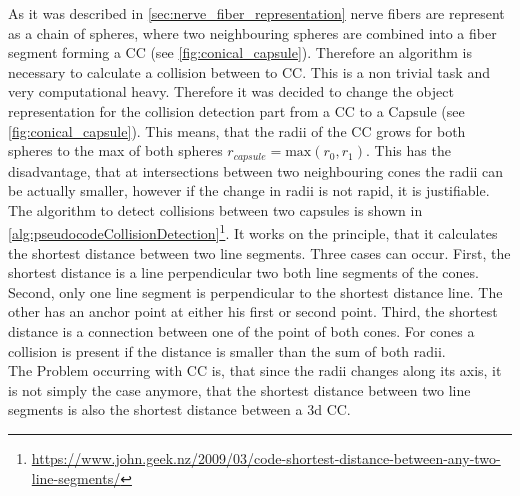 % 
As it was described in \cref{sec:nerve_fiber_representation} nerve fibers are represent as a chain of spheres, where two neighbouring spheres are combined into a fiber segment forming a \ac{CC} (see \cref{fig:conical_capsule}).
% 
Therefore an algorithm is necessary to calculate a collision between to \ac{CC}.
This is a non trivial task and very computational heavy.
Therefore it was decided to change the object representation for the collision detection part from a \ac{CC} to a Capsule (see \cref{fig:conical_capsule}).
This means, that the radii of the \ac{CC} grows for both spheres to the max of both spheres $r_{\mathit{capsule}} = \mathrm{max}(r_0, r_1)$.
This has the disadvantage, that at intersections between two neighbouring cones the radii can be actually smaller, however if the change in radii is not rapid, it is justifiable.
\\
The algorithm to detect collisions between two capsules is shown in \cref{alg:pseudocodeCollisionDetection}\footnote{\href{https://www.john.geek.nz/2009/03/code-shortest-distance-between-any-two-line-segments/}{https://www.john.geek.nz/2009/03/code-shortest-distance-between-any-two-line-segments/}}.
% 
It works on the principle, that it calculates the shortest distance between two line segments.
Three cases can occur.
First, the shortest distance is a line perpendicular two both line segments of the cones.
Second, only one line segment is perpendicular to the shortest distance line.
The other has an anchor point at either his first or second point.
Third, the shortest distance is a connection between one of the point of both cones.
For cones a collision is present if the distance is smaller than the sum of both radii.
\\
% 
The Problem occurring with \ac{CC} is, that since the radii changes along its axis, it is not simply the case anymore, that the shortest distance between two line segments is also the shortest distance between a 3d \ac{CC}.
% 
